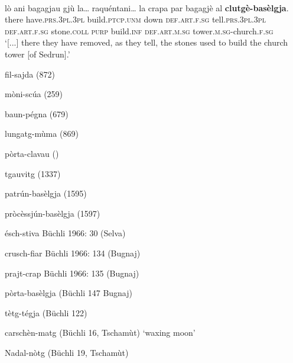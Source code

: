\ea\label{ex:}
\\
\gll[...] lò ani bagagjau gjù la… raquéntani… la crapa par bagagjè al \textbf{clutgè-basèlgja}.\\
{} there have.\textsc{prs.3pl.3pl} build.\textsc{ptcp.unm} down \textsc{def.art.f.sg} tell.\textsc{prs.3pl.3pl} \textsc{def.art.f.sg} stone.\textsc{coll} \textsc{purp} build.\textsc{inf}  \textsc{def.art.m.sg} tower.\textsc{m.sg}-church.\textsc{f.sg}  \\
\glt `[...] there they have removed, as they tell, the stones used to build the church tower [of Sedrun].'
\z

fil-sajda (872)

mòni-scúa (259)

baun-pégna (679)

lungatg-mùma (869)

pòrta-clavau ()

tgauvitg (1337)

patrún-basèlgja (1595)

pròcèssjún-basèlgja (1597)

ésch-stiva Büchli 1966: 30 (Selva)

crusch-fiar Büchli 1966: 134 (Bugnaj)

prajt-crap Büchli 1966: 135 (Bugnaj)

pòrta-basèlgja (Büchli 147 Bugnaj)

tètg-tégja (Büchli 122)

carschèn-matg (Büchli 16, Tschamùt) `waxing moon'

Nadal-nòtg (Büchli 19, Tschamùt)

